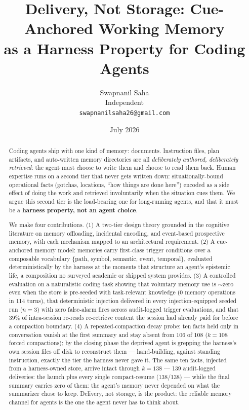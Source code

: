 \documentclass[11pt]{article}
\title{Delivery, Not Storage: Cue-Anchored Working Memory\\as a Harness Property for Coding Agents}
\author{Swapnanil Saha\\Independent\\\texttt{swapnanilsaha26@gmail.com}}
\date{July 2026}
\begin{document}
\maketitle

\begin{abstract}
Coding agents ship with one kind of memory: documents. Instruction files,
plan artifacts, and auto-written memory directories are all \emph{deliberately
authored, deliberately retrieved}: the agent must choose to write them and
choose to read them back. Human expertise runs on a second tier that never
gets written down: situationally-bound operational facts (gotchas,
locations, ``how things are done here'') encoded as a side effect of doing
the work and retrieved involuntarily when the situation cues them. We argue
this second tier is the load-bearing one for long-running agents, and that
it must be a \textbf{harness property, not an agent choice}.

We make four contributions. (1) A two-tier design theory grounded in the
cognitive literature on memory offloading, incidental encoding, and
event-based prospective memory, with each mechanism mapped to an
architectural requirement. (2) A cue-anchored memory model: memories carry
first-class trigger conditions over a composable vocabulary \{path, symbol,
semantic, event, temporal\}, evaluated deterministically by the harness at
the moments that structure an agent's epistemic life, a composition no
surveyed academic or shipped system provides. (3) A controlled evaluation
on a naturalistic coding task showing that voluntary memory use is $\sim$zero
even when the store is pre-seeded with task-relevant knowledge (0 memory
operations in 114 turns), that deterministic injection delivered in every
injection-equipped seeded run ($n=3$) with zero false-alarm fires across audit-logged trigger
evaluations, and that 39\% of intra-session re-reads re-retrieve content
the session had already paid for before a compaction boundary. (4) A
repeated-compaction decay probe: ten facts held only in conversation
vanish at the first summary and stay absent from 106 of 108 ($k=108$ forced
compactions); by the closing phase the deprived agent is grepping the
harness's own session files off disk to reconstruct them --- hand-building,
against standing instruction, exactly the tier the harness never gave it.
The same ten facts, injected from a harness-owned store, arrive intact
through $k=138$ --- 139 audit-logged deliveries: the launch plus every
single compact-resume (138/138) --- while the final
summary carries zero of them: the agent's memory never depended on what
the summarizer chose to keep. Delivery, not storage, is the product: the
reliable memory channel for agents is the one the agent never has to
think about.
\end{abstract}
\end{document}
